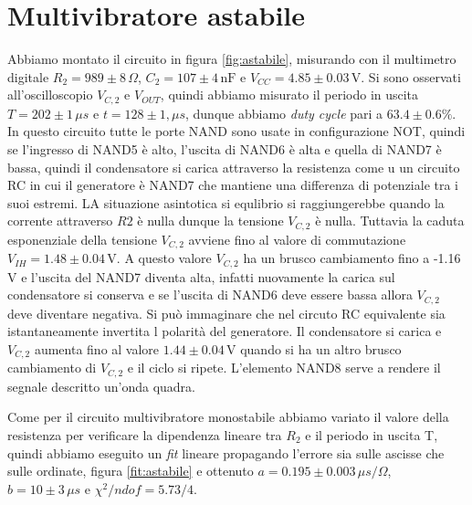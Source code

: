 \documentclass[10pt,a4paper]{article}
\begin{document}
\section{Multivibratore astabile}
Abbiamo montato il circuito in figura \ref{fig:astabile}, misurando con il multimetro digitale $R_2= 989\pm8\,\Omega$, $C_2= 107\pm4 \,\text{nF} $ e $V_{CC}= 4.85\pm0.03\,\text{V}$. Si sono osservati all'oscilloscopio $V_{C,2}$ e $V_{OUT}$, quindi abbiamo misurato il periodo in uscita $T= 202\pm1\,\mu s $ e $t= 128\pm1,\mu s $, dunque  abbiamo \emph{duty cycle} pari a $63.4\pm0.6\%$. In questo circuito tutte le porte NAND sono usate in configurazione NOT, quindi se l'ingresso di NAND5 è alto, l'uscita di NAND6 è alta e quella di NAND7 è bassa, quindi il condensatore si carica attraverso la resistenza come u un circuito RC in cui il generatore è NAND7 che mantiene una differenza di potenziale tra i suoi estremi. LA situazione asintotica si equlibrio si raggiungerebbe quando la corrente attraverso $R2$ è nulla dunque la tensione $V_{C,2}$ è nulla. Tuttavia la caduta esponenziale della tensione $V_{C,2}$ avviene fino al valore di commutazione $V_{IH}=1.48\pm0.04\,\text{V}$. A questo valore $V_{C,2}$ ha un brusco cambiamento fino a -1.16 V e l'uscita del NAND7 diventa alta, infatti nuovamente la carica sul condensatore si conserva e se l'uscita di NAND6 deve essere bassa allora $V_{C,2}$ deve diventare negativa. Si può immaginare che nel circuto RC equivalente sia istantaneamente invertita l polarità del generatore. Il condensatore si carica e $V_{C,2}$ aumenta fino al valore $1.44\pm0.04\,\text{V}$ quando si ha un altro brusco cambiamento di $V_{C,2}$ e il ciclo si ripete. L'elemento NAND8 serve a rendere il segnale descritto un'onda quadra.


Come per il circuito multivibratore monostabile abbiamo variato il valore della resistenza per verificare la dipendenza lineare tra $R_2$ e il periodo in uscita T, quindi abbiamo eseguito un \emph{fit} lineare propagando l'errore sia sulle ascisse che sulle ordinate, figura \ref{fit:astabile} e ottenuto $a=0.195\pm0.003\,\mu s/\Omega$, $b=10\pm3\,\mu s$ e $\chi^2/ndof=5.73/4$.
\end{document}
